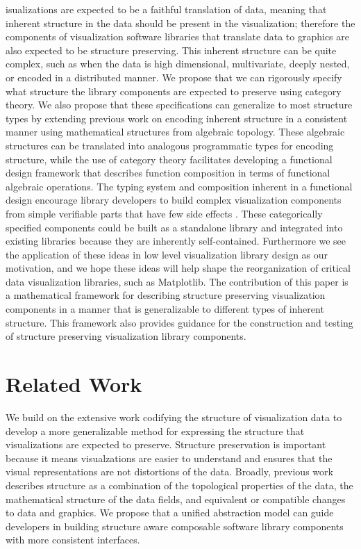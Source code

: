 \documentclass[10pt,journal,compsoc]{IEEEtran}
\theoremstyle{definition}
\theoremstyle{remark}
\begin{document}
isualizations are expected to be a faithful translation of data, meaning that inherent structure in the data should be present in the visualization; therefore the components of visualization software libraries that translate data to graphics are also expected to be structure preserving. This inherent structure can be quite complex, such as when the data is high dimensional, multivariate, deeply nested, or encoded in a distributed manner. We propose that we can rigorously specify what structure the library components are expected to preserve using category theory. We also propose that these specifications can generalize to most structure types by extending previous work on encoding  inherent structure in a consistent manner using mathematical structures from algebraic topology. These algebraic structures can be translated into analogous programmatic types for encoding structure, while the use of category theory facilitates developing a functional design framework that describes function composition in terms of functional algebraic operations. The typing system and composition inherent in a functional design encourage library developers to build complex visualization components from simple verifiable parts that have few side effects \cite{huHowFunctionalProgramming2015, hughesWhyFunctionalProgramming1989}. These categorically specified components could be built as a standalone library and integrated into existing libraries because they are inherently self-contained. Furthermore we see the application of these ideas in low level visualization library design as our motivation, and we hope these ideas will help shape the reorganization of critical data visualization libraries, such as Matplotlib. The contribution of this paper is a mathematical framework for describing structure preserving visualization components in a manner that is generalizable to different types of inherent structure. This framework also provides guidance for the construction and testing of structure preserving visualization library components. 

\section{Related Work}
We build on the extensive work codifying the structure of visualization data to develop a more generalizable method for expressing the structure that visualizations are expected to preserve. Structure preservation is important because it means visualzations are easier to understand \cite{norman_things_smart} and ensures that the visual representations are not distortions of the data\cite{tufteVisualDisplayQuantitative2001}. Broadly, previous work describes structure as a combination of the topological properties of the data, the mathematical structure of the data fields, and equivalent or compatible changes to data and graphics. We propose that a unified abstraction model can guide developers in building structure aware composable software library components with more consistent interfaces. 
\end{document}

